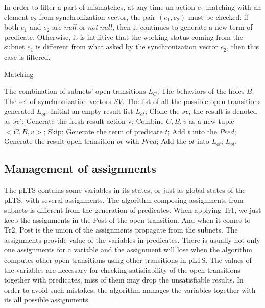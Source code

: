 \documentclass{lncs/llncs}
\newcommand{\QIN}[1]{\textcolor{airforceblue}{#1}}
\begin{document}
\QIN{
In order to filter a part of mismatches, at any time an action $e_1$ matching with an element $e_2$ from synchronization vector, the pair $(e_1, e_2)$ must be checked: if both $e_1$ and $e_2$ are $null$ or $not\ null$, then it continues to generate a new term of predicate. Otherwise, it is intuitive that the working status coming from the subnet $e_1$ is different from what asked by the synchronization vector $e_2$, then this case is filtered. 
}
\begin{algorithm}
\caption{Matching}
\begin{algorithmic}[1]

\Require 
The combination of subnets' open transitions $L_C$;
The behaviors of the holes $B$;
The set of synchronization vectors $SV$.
\Ensure 
The list of all the possible open transitions generated $L_{ot}$.
\State Initial an empty result list $L_{ot}$;
		\State Clone the $sv$, the result is denoted as $sv'$;
		\State Generate the fresh result action v;
		\State Combine $C, B, v$ as a new tuple $<C, B, v>$;
			\State Skip;
			\Else 
			\State Generate the term of predicate $t$;
			\State Add $t$ into the $Pred$;
			\EndIf
		\EndFor
		\State Generate the result open transition $ot$ with $Pred$;
		\State Add the $ot$ into $L_{ot}$;
	\EndFor
\EndFor 
\State \Return $L_{ot}$;

\end{algorithmic} 
\end{algorithm}

\subsection{Management of assignments}
\QIN{
The pLTS contains some variables in its states, or just as global states of the pLTS, with several assignments. The algorithm composing assignments from subnets is different from the generation of predicates. When applying Tr1, we just keep the assignments in the Post of the open transition. And when it comes to Tr2, Post is the union of the assignments propagate from the subnets. The assignments provide value of the variables in predicates. There is usually not only one assignments for a variable and the assignment will lose when the algorithm computes other open transitions using other transitions in pLTS. The values of the variables are necessary for checking satisfiability of the open transitions together with predicates, miss of them may drop the unsatisfiable results. In order to avoid such mistakes, the algorithm manages the variables together with its all possible assignments.
}
\end{document}
